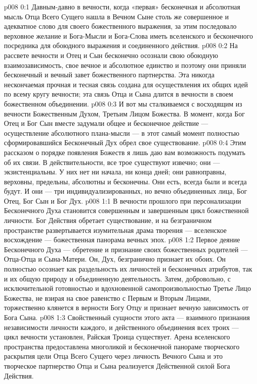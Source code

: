 \author{Божественный Советник}
\vs p008 0:1 Давным\hyp{}давно в вечности, когда «первая» бесконечная и абсолютная мысль Отца Всего Сущего нашла в Вечном Сыне столь же совершенное и адекватное слово для своего божественного выражения, за этим последовало верховное желание и Бога\hyp{}Мысли и Бога\hyp{}Слова иметь вселенского и бесконечного посредника для обоюдного выражения и соединенного действия.
\vs p008 0:2 На рассвете вечности и Отец и Сын бесконечно осознали свою обоюдную взаимозависимость, свое вечное и абсолютное единство и поэтому они приняли бесконечный и вечный завет божественного партнерства. Эта никогда нескончаемая прочная и тесная связь создана для осуществления их общих идей по всему кругу вечности; эта связь Отца и Сына длится в вечности в своем божественном объединении.
\vs p008 0:3 И вот мы сталкиваемся с восходящим из вечности Божественным Духом, Третьим Лицом Божества. В момент, когда Бог Отец и Бог Сын вместе задумали общее и бесконечное действие --- осуществление абсолютного плана\hyp{}мысли --- в этот самый момент полностью сформировавшийся Бесконечный Дух обрел свое существование.
\vs p008 0:4 \pc Этим рассказом о порядке появления Божеств я лишь даю вам возможность подумать об их связи. В действительности, все трое существуют извечно; они --- экзистенциальны. У них нет ни начала, ни конца дней; они равноправны, верховны, предельны, абсолютны и бесконечны. Они есть, всегда были и всегда будут. И они --- три индивидуализированных, но вечно объединенных лица, Бог Отец, Бог Сын и Бог Дух.
\vs p008 1:1 В вечности прошлого при персонализации Бесконечного Духа становится совершенным и завершенным цикл божественной личности. Бог Действия обретает существование, и на безграничном пространстве развертывается изумительная драма творения --- вселенское восхождение --- божественная панорама вечных эпох.
\vs p008 1:2 Первое деяние Бесконечного Духа --- обретение и признание своих божественных родителей --- Отца\hyp{}Отца и Сына\hyp{}Матери. Он, Дух, безгранично признает их обоих. Он полностью осознает как раздельность их личностей и бесконечных атрибутов, так и их общую природу и объединенную деятельность. Затем, добровольно, с исключительной готовностью и вдохновенной самопроизвольностью Третье Лицо Божества, не взирая на свое равенство с Первым и Вторым Лицами, торжественно клянется в верности Богу Отцу и признает вечную зависимость от Бога Сына.
\vs p008 1:3 Свойственный сущности этого акта --- взаимного признания независимости личности каждого, и действенного объединения всех троих --- цикл вечности установлен, Райская Троица существует. Арена вселенского пространства предоставлена многоликой и бесконечной панораме творческого раскрытия цели Отца Всего Сущего через личность Вечного Сына и это творческое партнерство Отца и Сына реализуется Действенной силой Бога Действия.
